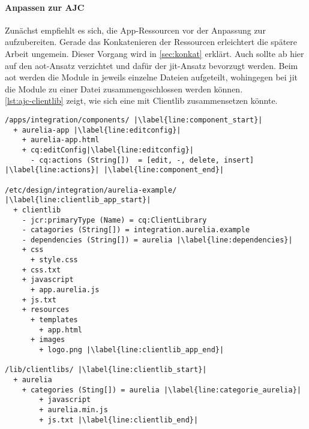 \paragraph{Anpassen zur AJC}
Zunächst empfiehlt es sich, die App-Ressourcen vor der Anpassung zur \ajc aufzubereiten. Gerade das Konkatenieren der Ressourcen erleichtert die spätere Arbeit ungemein. Dieser Vorgang wird in \autoref{sec:konkat} erklärt. Auch sollte ab hier auf den \ac{aot}-Ansatz verzichtet und dafür der \ac{jit}-Ansatz bevorzugt werden. Beim \ac{aot} werden die Module in jeweils einzelne Dateien aufgeteilt, wohingegen bei \ac{jit} die Module zu einer Datei zusammengeschlossen werden können. \\
\autoref{lst:ajc-clientlib} zeigt, wie sich eine \ajc mit Clientlib zusammensetzen könnte.

\begin{lstlisting}[style=jcr, caption=Eine Beispiel-AJC mit Clientlib, label=lst:ajc-clientlib,escapechar=|]
/apps/integration/components/ |\label{line:component_start}|
  + aurelia-app |\label{line:editconfig}|
    + aurelia-app.html
    + cq:editConfig|\label{line:editconfig}|
      - cq:actions (String[])  = [edit, -, delete, insert] |\label{line:actions}| |\label{line:component_end}|

/etc/design/integration/aurelia-example/ |\label{line:clientlib_app_start}|
  + clientlib
    - jcr:primaryType (Name) = cq:ClientLibrary
    - catagories (String[]) = integration.aurelia.example
    - dependencies (String[]) = aurelia |\label{line:dependencies}|
    + css
      + style.css
    + css.txt
    + javascript
      + app.aurelia.js
    + js.txt
    + resources
      + templates
        + app.html
      + images
        + logo.png |\label{line:clientlib_app_end}|
    
/lib/clientlibs/ |\label{line:clientlib_start}|
  + aurelia
  	+ categories (Sting[]) = aurelia |\label{line:categorie_aurelia}|
    	+ javascript
      	+ aurelia.min.js
    	+ js.txt |\label{line:clientlib_end}|
\end{lstlisting}

